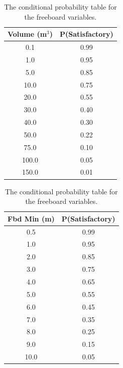 \documentclass{svproc}
\begin{document}
\begin{table}
	\begin{minipage}{0.5\linewidth}
		\caption{The conditional probability table for the volumetric variables.}
		\label{table:prob_volume}
		\centering
            \begin{tabular}{c c}
            \hline
            Volume (m$^3$) & P(Satisfactory) \\
            \hline
            0.1         & 0.99            \\
            1.0         & 0.95            \\
            5.0         & 0.85            \\
            10.0        & 0.75            \\
            20.0        & 0.55            \\
            30.0        & 0.40            \\
            40.0        & 0.30            \\
            50.0        & 0.22            \\
            75.0        & 0.10            \\
            100.0       & 0.05            \\
            150.0       & 0.01   \\
            \hline
            \end{tabular}
	\end{minipage}\hfill
	\begin{minipage}{0.45\linewidth}
		\caption{The conditional probability table for the freeboard variables.}
		\label{table:prob_fbd}
		\centering
            \begin{tabular}{c c}
            \hline
            Fbd Min (m) & P(Satisfactory) \\
            \hline
            0.5         & 0.99            \\
            1.0         & 0.95            \\
            2.0         & 0.85            \\
            3.0         & 0.75            \\
            4.0         & 0.65            \\
            5.0         & 0.55            \\
            6.0         & 0.45            \\
            7.0         & 0.35            \\
            8.0         & 0.25            \\
            9.0         & 0.15            \\
            10.0        & 0.05  \\
            \hline
            \end{tabular}
	\end{minipage}
\end{table}
\end{document}
